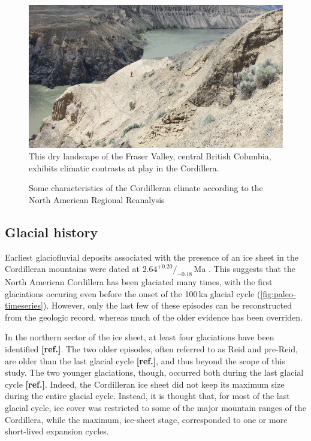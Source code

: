 \documentclass{article}
\newcommand{\mref}[0]{\textbf{[ref.]}}
\begin{document}
\begin{figure}
  \centering
  \includegraphics{photo-fraser-valley}
  \caption{This dry landscape of the Fraser Valley, central British Columbia,
           exhibits climatic contrasts at play in the Cordillera.}
  \label{fig:photo-fraser-valley}
\end{figure}

\begin{figure}
  \centering
  \caption{Some characteristics of the Cordilleran climate according to the
           North American Regional Reanalysis
           \citep[NARR,][]{Mesinger.etal.2006}}
  \label{fig:plot-atm}
\end{figure}


\subsection{Glacial history}

Earliest glaciofluvial deposits associated with the presence of an ice sheet in
the Cordilleran mountains were dated at $2.64^{+0.20}/_{-0.18}$\,Ma
\citep{Hidy.etal.2013}. This suggests that the North American Cordillera has
been glaciated many times, with the first glaciations occuring even before the
onset of the 100\,ka glacial cycle (\cref{fig:paleo-timeseries}). However, only
the last few of these episodes can be reconstructed from the geologic record,
whereas much of the older evidence has been overriden.

In the northern sector of the ice sheet, at least four glaciations have been
identified \mref. The two older episodes, often referred to as Reid and
pre-Reid, are older than the last glacial cycle \mref, and thus beyond the
scope of this study. The two younger glaciations, though, occurred both during
the last glacial cycle \mref. Indeed, the Cordilleran ice sheet did not keep
its maximum size during the entire glacial cycle. Instead, it is thought that,
for most of the last glacial cycle, ice cover was restricted to some of the
major mountain ranges of the Cordillera, while the maximum, ice-sheet stage,
corresponded to one or more short-lived expansion cycles.
\end{document}
